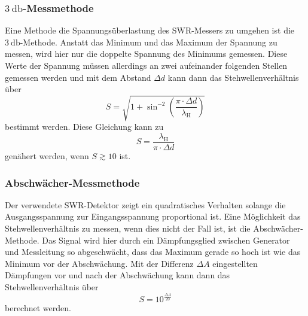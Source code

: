 \subsubsection{\texorpdfstring{$\SI{3}{\decibel}$-Messmethode}{3dB-Messmethode}}
\label{sssec:3dB_Messmethode}

Eine Methode die Spannungsüberlastung des SWR-Messers zu umgehen ist die $\SI{3}{\decibel}$-Methode.
Anstatt das Minimum und das Maximum der Spannung zu messen, 
wird hier nur die doppelte Spannung des Minimums gemessen.
Diese Werte der Spannung müssen allerdings an zwei aufeinander folgenden Stellen gemessen werden 
und mit dem Abstand $\Delta d$ kann dann das Stehwellenverhältnis über
\begin{equation}
    S = \sqrt{1 + \sin^{-2}\left( \frac{\pi \cdot \Delta d}{\lambda_\text{H}} \right)}
    \label{eq:3dB_Methode}
\end{equation}
bestimmt werden.
Diese Gleichung kann zu 
\begin{equation}
    S = \frac{\lambda_\text{H}}{\pi \cdot \Delta d}
    \label{eq:3dB_Methode_genähert}
\end{equation}
genähert werden, wenn $S \gtrsim 10$ ist.

\subsubsection{Abschwächer-Messmethode}
\label{sssec:Abschwächer_Messmethode}

Der verwendete SWR-Detektor zeigt ein quadratisches Verhalten solange die Ausgangsspannung zur Eingangsspannung proportional ist.
Eine Möglichkeit das Stehwellenverhältnis zu messen, wenn dies nicht der Fall ist, ist die Abschwächer-Methode.
Das Signal wird hier durch ein Dämpfungsglied zwischen Generator und Messleitung so abgeschwächt, dass das Maximum gerade so hoch ist wie das Minimum vor der Abschwächung.
Mit der Differenz $\Delta A$ eingestellten Dämpfungen vor und nach der Abschwächung kann dann das Stehwellenverhältnis über
\begin{equation}
    S = 10^{\frac{\Delta A}{20}}
    \label{eq:Abschwächer_Methode}
\end{equation}
berechnet werden.
